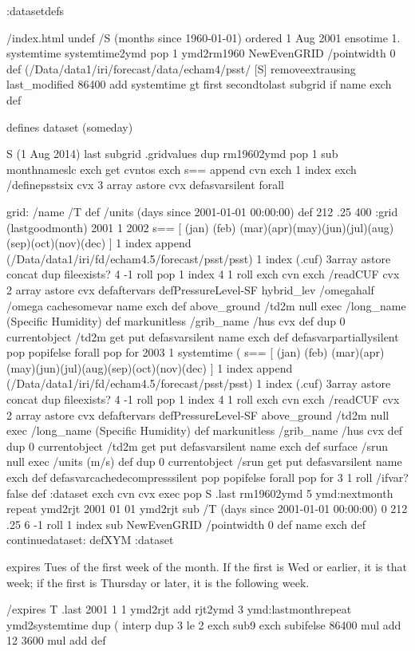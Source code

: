 \begin{ingrid}
:datasetdefs

/index.html undef
/S (months since 1960-01-01) ordered
1 Aug 2001 ensotime
1.
systemtime systemtime2ymd pop 1
ymd2rm1960
NewEvenGRID
/pointwidth 0 def
{
(/Data/data1/iri/forecast/data/echam4/psst/%
[S]
} removeextrausing
last_modified 86400 add
systemtime gt 
{ first secondtolast subgrid} if
name exch def
\end{ingrid}
defines dataset (someday)
\begin{ingrid}
S (1 Aug 2014) last subgrid .gridvalues
{
dup rm19602ymd pop
1 sub monthnameslc exch get cvntos exch s== append cvn exch 1 index exch /definepsstsix cvx 3 array astore cvx defasvarsilent
} forall
\end{ingrid}
\begin{ingrid}
grid:
/name /T def
/units (days since 2001-01-01 00:00:00) def
212 .25 400
:grid
(lastgoodmonth) 
2001 1 2002
{
s==
[ (jan) (feb) (mar)(apr)(may)(jun)(jul)(aug)(sep)(oct)(nov)(dec) ]
{
1 index append 
(/Data/data1/iri/fd/echam4.5/forecast/psst/psst) 1 index (.cuf) 3array astore concat
dup fileexists?
{
4 -1 roll pop 1 index 4 1 roll
 exch cvn exch /readCUF cvx 2 array astore cvx 
{defaftervars
defPressureLevel-SF
hybrid_lev /omegahalf /omega cachesomevar
name exch def
above_ground
/td2m
{null  exec
  /long_name (Specific Humidity) def
  markunitless
/grib_name /hus cvx def
}
dup 0 currentobject 
/td2m get
put
defasvarsilent
name exch def
} defasvarpartiallysilent
} 
{pop pop}ifelse
} forall
pop
} for
2003 1 
systemtime (%
{
s==
[ (jan) (feb) (mar)(apr)(may)(jun)(jul)(aug)(sep)(oct)(nov)(dec) ]
{
1 index append 
(/Data/data1/iri/fd/echam4.5/forecast/psst/psst) 1 index (.cuf) 3array astore
concat
dup fileexists?
{
4 -1 roll pop 1 index 4 1 roll
 exch cvn exch /readCUF cvx 2 array astore cvx 
{defaftervars
defPressureLevel-SF
above_ground
/td2m
{null  exec
  /long_name (Specific Humidity) def
  markunitless
/grib_name /hus cvx def
}
dup 0 currentobject 
/td2m get
put
defasvarsilent
name exch def
surface
/srun
{null  exec
/units (m/s) def
}
dup 0 currentobject 
/srun get
put
defasvarsilent
name exch def
} defasvarcachedecompresssilent
} 
{pop pop}ifelse
} forall
pop
} for
3 1 roll
/ifvar? false def
:dataset
exch
cvn cvx exec
pop
S .last
rm19602ymd 
5 {ymd:nextmonth} repeat
ymd2rjt
2001 01 01 ymd2rjt sub
/T
(days since 2001-01-01 00:00:00)
0
212 .25 6 -1 roll 1 index sub
NewEvenGRID 
/pointwidth 0 def
name exch def
continuedataset:
defXYM
:dataset
\end{ingrid}
expires Tues of the first week of the month.  If the first is Wed or earlier, it is that week; if the first is Thursday or later, it is the following week.
\begin{ingrid}
 /expires T .last
    2001
     1 1 ymd2rjt
     add
    rjt2ymd
      3 {ymd:lastmonth}repeat
ymd2systemtime
   dup
    (%
    interp
    dup
     3 le
     {2 exch sub}{9 exch sub}ifelse
    86400 mul
    add
    12
     3600 mul
     add
    def
\end{ingrid}




